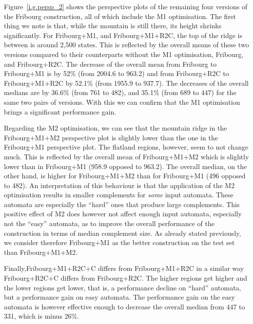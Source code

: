 Figure~\ref{i.g.persp_2} shows the perspective plots of the remaining four versions of the Fribourg construction, all of which include the M1 optimisation. The first thing we note is that, while the mountain is still there, its height shrinks significantly. For Fribourg+M1, and Fribourg+M1+R2C, the top of the ridge is between is around 2,500 states. This is reflected by the overall means of these two versions compared to their counterparts without the M1 optimisation, Fribourg, and Fribourg+R2C. The decrease of the overall mean from Fribourg to Fribourg+M1 is by 52\% (from 2004.6 to 963.2) and from Fribourg+R2C to Fribourg+M1+R2C by 52.1\% (from 1955.9 to 937.7). The decreases of the overall medians are by 36.6\% (from 761 to 482), and 35.1\% (from 689 to 447) for the same two pairs of versions. With this we can confirm that the M1 optimisation brings a significant performance gain. 

Regarding the M2 optimisation, we can see that the mountain ridge in the Fribourg+M1+M2 perspective plot is slightly lower than the one in the Fribourg+M1 perspective plot. The flatland regions, however, seem to not change much. This is reflected by the overall mean of Fribourg+M1+M2 which is slightly lower than in Fribourg+M1 (958.9 opposed to 963.2). The overall median, on the other hand, is higher for Fribourg+M1+M2 than for Fribourg+M1 (496 opposed to 482). An interpretation of this behaviour is that the application of the M2 optimisation results in smaller complements for \textit{some} input automata. These automata are especially the ``hard'' ones that produce large complements. This positive effect of M2 does however not affect enough input automata, especially not the ``easy'' automata, as to improve the overall performance of the construction in terms of median complement size. As already stated previously, we consider therefore Fribourg+M1 as the better construction on the \goal{} test set than Fribourg+M1+M2.

Finally,Fribourg+M1+R2C+C differs from Fribourg+M1+R2C in a similar way Fribourg+R2C+C differs from Fribourg+R2C. The higher regions get higher and the lower regions get lower, that is, a performance decline on ``hard'' automata, but a performance gain on easy automata. The performance gain on the easy automata is however effective enough to decrease the overall median from 447 to 331, which is minus 26\%.

